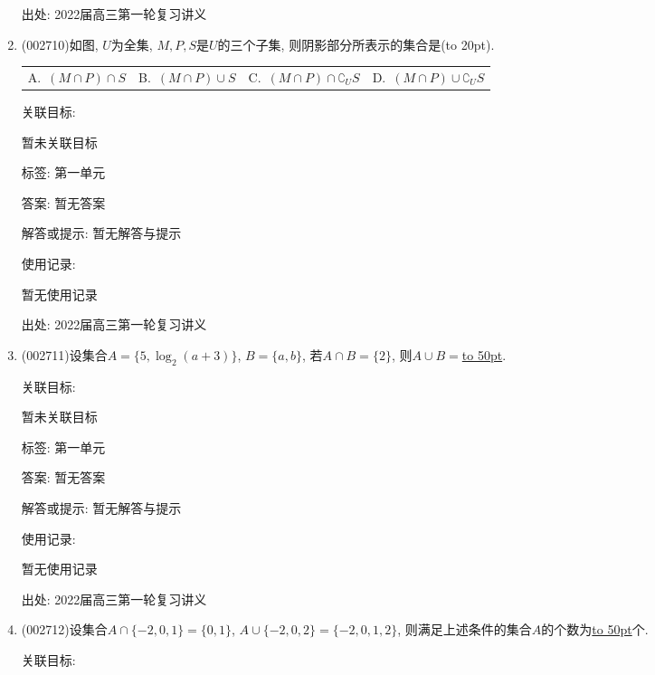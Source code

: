 \documentclass[10pt,a4paper]{article}
\newcommand{\blank}[1]{\underline{\hbox to #1pt{}}}
\newcommand{\bracket}[1]{(\hbox to #1pt{})}
\newcommand{\fourch}[4]{\par\begin{tabular}{p{.23\textwidth}p{.23\textwidth}p{.23\textwidth}p{.23\textwidth}}
A.~#1 &B.~#2& C.~#3& D.~#4
\end{tabular}}
\begin{document}
\begin{enumerate}[1.]
出处: 2022届高三第一轮复习讲义
\item { (002710)}如图, $U$为全集, $M,P,S$是$U$的三个子集, 则阴影部分所表示的集合是\bracket{20}.
\begin{center}
\end{center}
\fourch{$(M\cap P)\cap S$}{$(M\cap P)\cup S$}{$(M\cap P)\cap \complement_U S$}{$(M\cap P)\cup \complement_U S$}


关联目标:

暂未关联目标



标签: 第一单元

答案: 暂无答案

解答或提示: 暂无解答与提示

使用记录:

暂无使用记录


出处: 2022届高三第一轮复习讲义
\item { (002711)}设集合$A=\{5,\log_2(a+3)\}$, $B=\{a,b\}$, 若$A\cap B=\{2\}$, 则$A\cup B=$\blank{50}.


关联目标:

暂未关联目标



标签: 第一单元

答案: 暂无答案

解答或提示: 暂无解答与提示

使用记录:

暂无使用记录


出处: 2022届高三第一轮复习讲义
\item { (002712)}设集合$A\cap \{-2,0,1\}=\{0,1\}$, $A\cup \{-2,0,2\}=\{-2,0,1,2\}$, 则满足上述条件的集合$A$的个数为\blank{50}个.


关联目标:


\end{enumerate}
\end{document}
